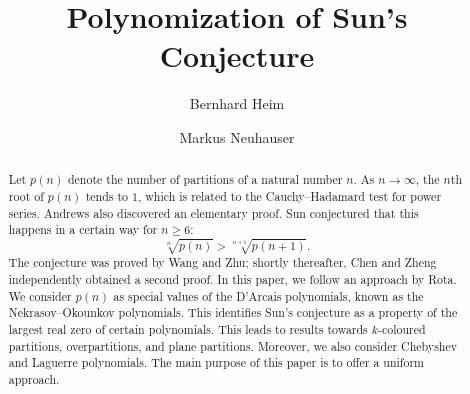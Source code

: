 \documentclass[11pt,reqno]{amsart}
\theoremstyle{plain}
\theoremstyle{remark}
\theoremstyle{definition}
\numberwithin{equation}{section}
\begin{document}
\title{Polynomization of Sun's Conjecture}
\author{Bernhard Heim}
\address{Department of Mathematics and Computer Science\\Division of Mathematics\\University of Cologne\\ Weyertal 86--90 \\ 50931 Cologne \\Germany}
\address{Lehrstuhl A f\"{u}r Mathematik, RWTH Aachen University, 52056 Aachen, Germany}
\author{Markus Neuhauser}
\address{Kutaisi International University, 5/7, Youth Avenue,  Kutaisi, 4600 Georgia}
\address{Lehrstuhl
f\"{u}r Geometrie und
Analysis, RWTH Aachen University, 52056 Aachen, Germany}
\begin{abstract}
Let $p(n)$ denote
the number of partitions of a natural number $n$. 
As $ n \to \infty$, the $n$th root
of $p(n)$ tends to $1$,
which is related to the Cauchy--Hadamard test for power series. Andrews also discovered an elementary proof.
Sun conjectured that this happens in a certain way for $n\geq 6$:
\begin{equation*}
\sqrt[n]{p(n)} > \sqrt[n+1]{p(n+1)}.
\end{equation*}
The conjecture was proved by Wang and Zhu; shortly thereafter, Chen and Zheng independently obtained a second proof.
 In this paper, we follow an approach by
 Rota. We consider $p(n)$ as special values of the D'Arcais polynomials, known as the Nekrasov--Okounkov polynomials.  This identifies Sun's conjecture as a property of the largest real zero of certain polynomials. This leads to results towards $k$-coloured partitions, overpartitions, and plane partitions. Moreover, we also consider Chebyshev and Laguerre polynomials. The main purpose of this paper is to offer a
 uniform approach.
\end{abstract}
\maketitle
\end{document}
